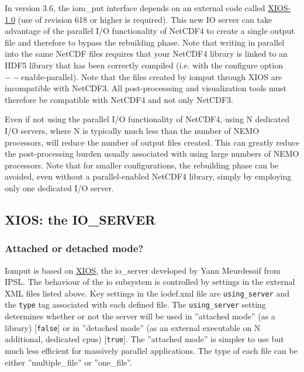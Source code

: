 In version 3.6, the iom\_put interface depends on an external code called \href{https://forge.ipsl.jussieu.fr/ioserver/browser/XIOS/branchs/xios-1.0}{XIOS-1.0} (use of revision 618 or higher is required). This new IO server can take advantage of the parallel I/O functionality of NetCDF4 to create a single output file and therefore to bypass the rebuilding phase. Note that writing in parallel into the same NetCDF files requires that your NetCDF4 library is linked to an HDF5 library that has been correctly compiled (i.e. with the configure option $--$enable-parallel). Note that the files created by iomput through XIOS are incompatible with NetCDF3. All post-processsing and visualization tools must therefore be compatible with NetCDF4 and not only NetCDF3.

Even if not using the parallel I/O functionality of NetCDF4, using N dedicated I/O servers, where N is typically much less than the number of NEMO processors, will reduce the number of output files created. This can greatly reduce the post-processing burden usually associated with using large numbers of NEMO processors. Note that for smaller configurations, the rebuilding phase can be avoided, even without a parallel-enabled NetCDF4 library, simply by employing only one dedicated I/O server.

\subsection{XIOS: the IO\_SERVER}

\subsubsection{Attached or detached mode?}

Iomput is based on \href{http://forge.ipsl.jussieu.fr/ioserver/wiki}{XIOS}, the io\_server developed by Yann Meurdesoif from IPSL. The behaviour of the io subsystem is controlled by settings in the external XML files listed above. Key settings in the iodef.xml file are {\tt using\_server} and the {\tt type} tag associated with each defined file. The {\tt using\_server} setting determines whether or not the server will be used in ''attached mode'' (as a library) [{\tt false}] or in ''detached mode'' (as an external executable on N additional, dedicated cpus) [{\tt true}]. The ''attached mode'' is simpler to use but much less efficient for massively parallel applications. The type of each file can be either ''multiple\_file'' or ''one\_file''.


